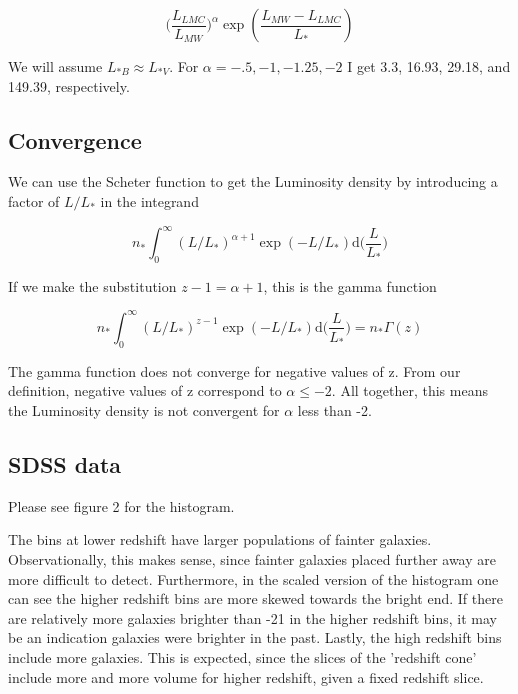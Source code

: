 \documentclass[12pt]{article}
\begin{document}
$$ \Big( \frac{L_{LMC}}{L_{MW}}\Big)^{\alpha} \exp(\frac{L_{MW} - L_{LMC}}{L_{*}}) $$

We will assume $L_{*B} \approx L_{*V}$. For $\alpha =  -.5, -1, -1.25,  -2$ I get 3.3, 16.93, 29.18, and 149.39, respectively.

\subsection{Convergence}
We can use the Scheter function to get the Luminosity density by introducing a factor of $L/L_* $ in the integrand

$$ n_* \int^{\infty}_0 (L/L_*)^{\alpha + 1} \exp(-L/L_*) \mathrm{d}\Big(\frac{L}{L_*}\Big) $$

If we make the substitution $z - 1 = \alpha +1$, this is the gamma function 

$$ n_* \int^{\infty}_0 (L/L_*)^{z -1} \exp(-L/L_*) \mathrm{d}\Big(\frac{L}{L_*}\Big) = n_* \Gamma(z)$$

The gamma function does not converge for negative values of z. From our definition, negative values of z correspond to $\alpha \leq -2$. All together, this means the Luminosity density is not convergent for $\alpha$ less than -2.

\subsection{SDSS data}
Please see figure 2 for the histogram.

The bins at lower redshift have larger populations of fainter galaxies. Observationally, this makes sense, since fainter galaxies placed further away are more difficult to detect. Furthermore, in the scaled version of the histogram one can see the higher redshift bins are more skewed towards the bright end. If there are relatively more galaxies brighter than -21 in the higher redshift bins, it may be an indication galaxies were brighter in the past. Lastly, the high redshift bins include more galaxies. This is expected, since the slices of the 'redshift cone' include more and more volume for higher redshift, given a fixed redshift slice. 
\end{document}
